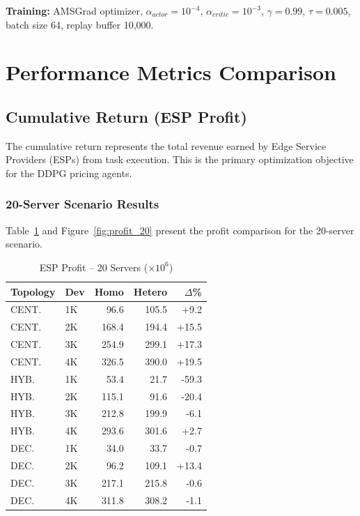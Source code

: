 \documentclass[conference]{IEEEtran}
\begin{document}
\textbf{Training:} AMSGrad optimizer, $\alpha_{actor}=10^{-4}$, $\alpha_{critic}=10^{-3}$, $\gamma=0.99$, $\tau=0.005$, batch size 64, replay buffer 10,000.

\section{Performance Metrics Comparison}

\subsection{Cumulative Return (ESP Profit)}

The cumulative return represents the total revenue earned by Edge Service Providers (ESPs) from task execution. This is the primary optimization objective for the DDPG pricing agents.

\subsubsection{20-Server Scenario Results}

Table~\ref{tab:profit_20} and Figure~\ref{fig:profit_20} present the profit comparison for the 20-server scenario.

\begin{table}[H]
\centering
\caption{ESP Profit -- 20 Servers ($\times 10^6$)}
\label{tab:profit_20}
\footnotesize
\begin{tabular}{@{}llrrr@{}}
\toprule
\textbf{Topology} & \textbf{Dev} & \textbf{Homo} & \textbf{Hetero} & \textbf{$\Delta$\%} \\
\midrule
CENT. & 1K & 96.6 & 105.5 & +9.2 \\
CENT. & 2K & 168.4 & 194.4 & +15.5 \\
CENT. & 3K & 254.9 & 299.1 & +17.3 \\
CENT. & 4K & 326.5 & 390.0 & +19.5 \\
\midrule
HYB. & 1K & 53.4 & 21.7 & -59.3 \\
HYB. & 2K & 115.1 & 91.6 & -20.4 \\
HYB. & 3K & 212.8 & 199.9 & -6.1 \\
HYB. & 4K & 293.6 & 301.6 & +2.7 \\
\midrule
DEC. & 1K & 34.0 & 33.7 & -0.7 \\
DEC. & 2K & 96.2 & 109.1 & +13.4 \\
DEC. & 3K & 217.1 & 215.8 & -0.6 \\
DEC. & 4K & 311.8 & 308.2 & -1.1 \\
\bottomrule
\end{tabular}
\end{table}
\end{document}

